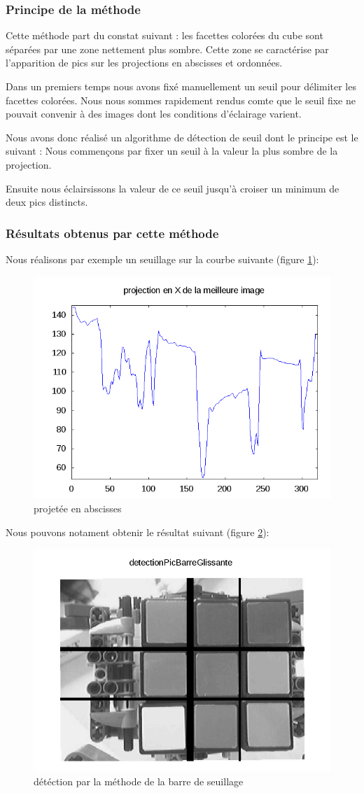 
\subsubsection*{Principe de la méthode} 

Cette méthode part du constat suivant : les facettes colorées du cube sont séparées par une zone nettement plus sombre. Cette zone se caractérise par l'apparition de pics sur les projections en abscisses et ordonnées. 

Dans un premiers temps nous avons fixé manuellement un seuil pour délimiter les facettes colorées. Nous nous sommes rapidement rendus comte que le seuil fixe ne pouvait convenir à des images dont les conditions d'éclairage varient. 

Nous avons donc réalisé un algorithme de détection de seuil dont le principe est le suivant : Nous commençons par fixer un seuil à la valeur la plus sombre de la projection.

Ensuite nous éclairsissons la valeur de ce seuil jusqu'à croiser un minimum de deux pics distincts.

\subsubsection*{Résultats obtenus par cette méthode}
 
 Nous réalisons par exemple un seuillage sur la courbe suivante (figure \ref{projX}):
 \begin{figure}[!h]
 \centering
 \includegraphics[width=0.60\linewidth]{Images/projX.png}
 \caption{projetée en abscisses} 
 \label{projX}
 \end{figure}
 
 Nous pouvons notament obtenir le résultat suivant (figure \ref{barreGlissante}):
\begin{figure}[!h]
 \centering
 \includegraphics[width=0.60\linewidth]{Images/detectionBarreGlissante.png}
 \caption{détéction par la méthode de la barre de seuillage} 
 \label{barreGlissante}
 \end{figure}
